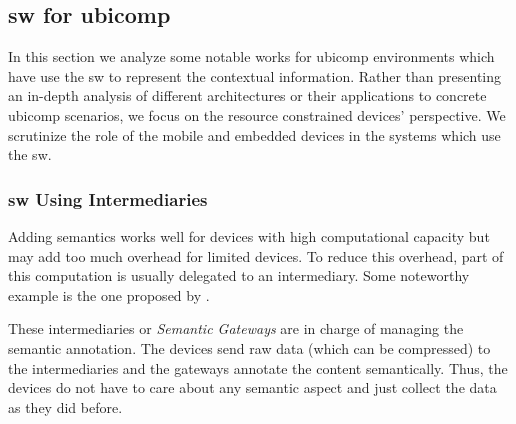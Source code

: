 \subsection{\acl{sw} for \acs{ubicomp}}


In this section we analyze some notable works for \ac{ubicomp} environments which have use the \ac{sw} to represent the contextual information.
Rather than presenting an in-depth analysis of different architectures or their applications to concrete \ac{ubicomp} scenarios,
we focus on the resource constrained devices' perspective.
We scrutinize the role of the mobile and embedded devices in the systems which use the \ac{sw}.


\subsubsection{\acl{sw} Using Intermediaries}
\label{sec:sw_intermediaries}




Adding semantics works well for devices with high computational capacity but may add too much overhead for limited devices.
To reduce this overhead, part of this computation is usually delegated to an intermediary.
Some noteworthy example is the one proposed by \citet{broring_semantic_2009}.






These intermediaries or \emph{Semantic Gateways} are in charge of managing the semantic annotation.
The devices send raw data (which can be compressed) to the intermediaries and the gateways annotate the content semantically.
Thus, the devices do not have to care about any semantic aspect and just collect the data as they did before.

